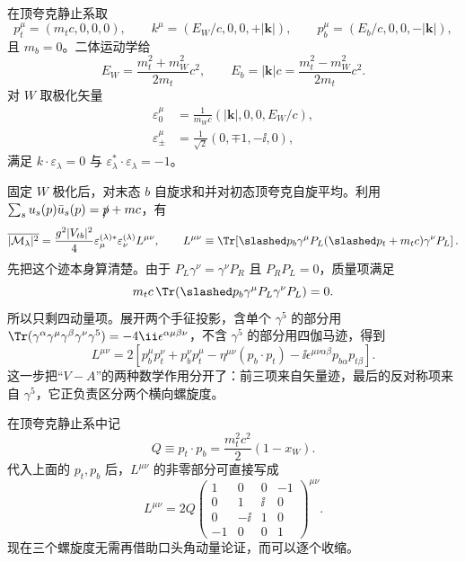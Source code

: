 \begin{derivation}[顶夸克衰变中的矢量螺旋度比例]
在顶夸克静止系取
\begin{equation*}
 p_t^\mu=(m_tc,0,0,0),
 \qquad
 k^\mu=\left(E_W/c,0,0,+|\mathbf k|\right),
 \qquad
 p_b^\mu=\left(E_b/c,0,0,-|\mathbf k|\right),
\end{equation*}
且 $m_b=0$。二体运动学给
\begin{equation*}
 E_W=\frac{m_t^2+m_W^2}{2m_t}c^2,
 \qquad
 E_b=|\mathbf k|c=\frac{m_t^2-m_W^2}{2m_t}c^2.
\end{equation*}
对 $W$ 取极化矢量
\begin{align*}
 \varepsilon_0^\mu
 &=\frac1{m_Wc}\left(|\mathbf k|,0,0,E_W/c\right),\\
 \varepsilon_\pm^\mu
 &=\frac1{\sqrt2}(0,\mp1,-\ii,0),
\end{align*}
满足 $k\cdot\varepsilon_\lambda=0$ 与 $\varepsilon_\lambda^*\cdot\varepsilon_\lambda=-1$。

固定 $W$ 极化后，对末态 $b$ 自旋求和并对初态顶夸克自旋平均。利用
\(\sum_su_s(p)\bar u_s(p)=\slashed p+mc\)，有
\begin{equation*}
 \overline{|\mathcal M_\lambda|^2}
 =\frac{g^2|V_{tb}|^2}{4}
 \varepsilon_{\mu}^{(\lambda)*}\varepsilon_\nu^{(\lambda)}
 L^{\mu\nu},
\qquad
 L^{\mu\nu}\equiv
 \Tr\!\left[
 \slashed p_b\gamma^\mu P_L(\slashed p_t+m_tc)
 \gamma^\nu P_L
 \right].
\end{equation*}
先把这个迹本身算清楚。由于
\(P_L\gamma^\nu=\gamma^\nu P_R\) 且 $P_RP_L=0$，质量项满足
\begin{equation*}
 m_tc\,\Tr(\slashed p_b\gamma^\mu P_L\gamma^\nu P_L)=0.
\end{equation*}
所以只剩四动量项。展开两个手征投影，含单个 $\gamma^5$ 的部分用
\(\Tr(\gamma^\alpha\gamma^\mu\gamma^\beta\gamma^\nu\gamma^5)
=-4\ii\epsilon^{\alpha\mu\beta\nu}\)，不含 $\gamma^5$ 的部分用四伽马迹，得到
\begin{equation*}
\boxed{
L^{\mu\nu}
=2\left[
 p_b^\mu p_t^\nu+p_b^\nu p_t^\mu
 -\eta^{\mu\nu}(p_b\cdot p_t)
 -\ii\epsilon^{\mu\nu\alpha\beta}p_{b\alpha}p_{t\beta}
 \right].}
\end{equation*}
这一步把“$V-A$”的两种数学作用分开了：前三项来自矢量迹，最后的反对称项来自 $\gamma^5$，它正负责区分两个横向螺旋度。

在顶夸克静止系中记
\begin{equation*}
 Q\equiv p_t\cdot p_b
 =\frac{m_t^2c^2}{2}(1-x_W).
\end{equation*}
代入上面的 $p_t,p_b$ 后，$L^{\mu\nu}$ 的非零部分可直接写成
\begin{equation*}
L^{\mu\nu}
=2Q
\begin{pmatrix}
 1&0&0&-1\\
 0&1&\ii&0\\
 0&-\ii&1&0\\
 -1&0&0&1
\end{pmatrix}^{\mu\nu}.
\end{equation*}
现在三个螺旋度无需再借助口头角动量论证，而可以逐个收缩。


\end{derivation}

